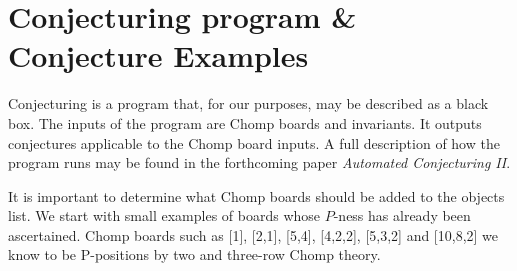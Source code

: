 \documentclass{amsart}
\theoremstyle{definition}
\theoremstyle{remark}
\numberwithin{equation}{section}
\begin{document}












\section{Conjecturing program \& Conjecture Examples}

Conjecturing is a program that, for our purposes, may be described as a black box.  The inputs of the program are Chomp boards and invariants.  It outputs conjectures applicable to the Chomp board inputs.  A full description of how the program runs may be found in the forthcoming paper \textit{Automated Conjecturing II}.

It is important to determine what Chomp boards should be added to the objects list.  We start with small examples of boards whose $P$-ness has already been ascertained.  Chomp boards such as [1], [2,1], [5,4], [4,2,2], [5,3,2]  and [10,8,2] we know to be P-positions by two\cite{Gale74} and three-row\cite{3row} Chomp theory.
\end{document}
